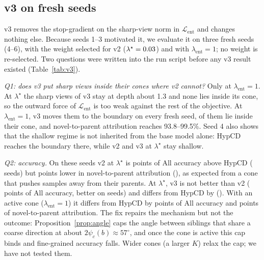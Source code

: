 \documentclass[10pt]{article}
\newcommand{\Lb}{\mathcal{L}}
\begin{document}
\subsection{v3 on fresh seeds}
v3 removes the stop-gradient on the sharp-view norm in $\Lb_{\mathrm{ent}}$ and changes nothing else. Because
seeds 1--3 motivated it, we evaluate it on three fresh seeds (4--6), with the weight selected for v2
($\lambda^\star=0.03$) and with $\lambda_{\mathrm{ent}}=1$; no weight is re-selected. Two questions were
written into the run script before any v3 result existed (Table~\ref{tab:v3}).

\emph{Q1: does v3 put sharp views inside their cones where v2 cannot?} Only at $\lambda_{\mathrm{ent}}=1$. At
$\lambda^\star$ the sharp views of v3 stay at depth about 1.3 and none lies inside its cone, so the outward force
of $\Lb_{\mathrm{ent}}$ is too weak against the rest of the objective. At $\lambda_{\mathrm{ent}}=1$, v3 moves them
to the boundary on every fresh seed, \VthreeConeRange{} of them lie inside their cone, and novel-to-parent
attribution reaches 93.8--99.5\%. Seed 4 also shows that the shallow regime is not inherited from the base model
alone: HypCD reaches the boundary there, while v2 and v3 at $\lambda^\star$ stay shallow.

\emph{Q2: accuracy.} On these seeds v2 at $\lambda^\star$ is \vdAllVtwo{} points of All accuracy above HypCD
(\vwAllVtwo{} seeds) but \vdNtpVtwo{} points lower in novel-to-parent attribution (\vwNtpVtwo{}), as expected from a
cone that pushes samples away from their parents. At $\lambda^\star$, v3 is not better than v2 (\vdAllVthreeVsVtwo{} points of All accuracy,
better on \vwAllVthreeVsVtwo{} seeds) and differs from HypCD by \vdAllVthree{} (\vwAllVthree{}). With an active
cone ($\lambda_{\mathrm{ent}}=1$) it differs from HypCD by \vdAllVthreeWone{} points of All accuracy and
\vdNtpVthreeWone{} points of novel-to-parent attribution. The fix repairs the mechanism but not the outcome:
Proposition~\ref{prop:angle} caps the angle between siblings that share a coarse direction at about
$2\psi_c(b)\approx57^\circ$, and once the cone is active this cap binds and fine-grained accuracy falls. Wider
cones (a larger $K$) relax the cap; we have not tested them.

\begin{table}[t]
\centering\small
{}
\caption{FreqCone v3 on fresh seeds 4--6. v3 differs from v2 only in letting $\Lb_{\mathrm{ent}}$ move the norm of
the sharp view. ``In cone'' is the share of sharp views inside the cone of their coarse view $b$.}\label{tab:v3}
\end{table}
\end{document}
